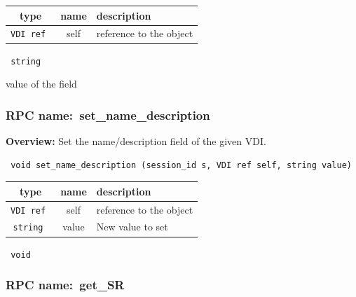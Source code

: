 
 
\vspace{0.3cm}
\begin{tabular}{|c|c|p{7cm}|}
 \hline
{\bf type} & {\bf name} & {\bf description} \\ \hline
{\tt VDI ref } & self & reference to the object \\ \hline 

\end{tabular}

\vspace{0.3cm}

{\tt 
string
}


value of the field
\vspace{0.3cm}
\vspace{0.3cm}
\vspace{0.3cm}
\subsubsection{RPC name:~set\_name\_description}

{\bf Overview:} 
Set the name/description field of the given VDI.

\begin{verbatim} void set_name_description (session_id s, VDI ref self, string value)\end{verbatim}



 
\vspace{0.3cm}
\begin{tabular}{|c|c|p{7cm}|}
 \hline
{\bf type} & {\bf name} & {\bf description} \\ \hline
{\tt VDI ref } & self & reference to the object \\ \hline 

{\tt string } & value & New value to set \\ \hline 

\end{tabular}

\vspace{0.3cm}

{\tt 
void
}



\vspace{0.3cm}
\vspace{0.3cm}
\vspace{0.3cm}
\subsubsection{RPC name:~get\_SR}

